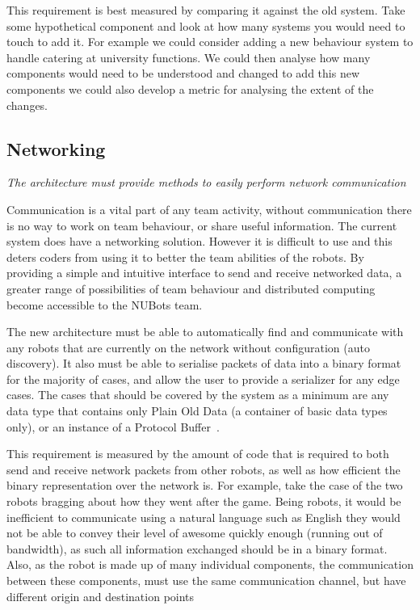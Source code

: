 \documentclass[english,12pt]{scrartcl}
\newcommand{\requirement}[1]{\textit{#1}}
\begin{document}
			This requirement is best measured by comparing it against the old system. Take some
			hypothetical component and look at how many systems you would need to touch to add it.
			For example we could consider adding a new behaviour system to handle catering at
			university functions. We could then analyse how many components would need to be
			understood and changed to add this new components we could also develop a metric for
			analysing the extent of the changes.


		\subsection{Networking}
			\requirement{The architecture must provide methods to easily perform network
			communication}

			Communication is a vital part of any team activity, without communication there is no
			way to work on team behaviour, or share useful information. The current system does have
			a networking solution. However it is difficult to use and this deters coders from using
			it to better the team abilities of the robots. By providing a simple and intuitive
			interface to send and receive networked data, a greater range of possibilities of team
			behaviour and distributed computing become accessible to the NUBots team.

			The new architecture must be able to automatically find and communicate with any robots
			that are currently on the network without configuration (auto discovery). It also must
			be able to serialise packets of data into a binary format for the majority of cases, and
			allow the user to provide a serializer for any edge cases. The cases that should be
			covered by the system as a minimum are any data type that contains only Plain Old Data
			(a container of basic data types only), or an instance of a
			Protocol Buffer~\cite{protobuf}.

			This requirement is measured by the amount of code that is required to both send and
			receive network packets from other robots, as well as how efficient the binary
			representation over the network is. For example, take the case of the two robots
			bragging about how they went after the game. Being robots, it would be inefficient to
			communicate using a natural language such as English they would not be able to convey
			their level of awesome quickly enough (running out of bandwidth), as such all
			information exchanged should be in a binary format. Also, as the robot is made up of
			many individual components, the communication between these components, must use the
			same communication channel, but have different origin and destination points
\end{document}
